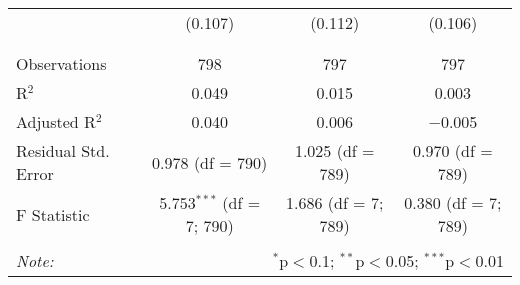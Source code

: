 \begin{table}[!htbp]
\begin{tabular}{@{\extracolsep{5pt}}lccc}
  & (0.107) & (0.112) & (0.106) \\ 
  & & & \\ 
\hline \\[-1.8ex] 
Observations & 798 & 797 & 797 \\ 
R$^{2}$ & 0.049 & 0.015 & 0.003 \\ 
Adjusted R$^{2}$ & 0.040 & 0.006 & $-$0.005 \\ 
Residual Std. Error & 0.978 (df = 790) & 1.025 (df = 789) & 0.970 (df = 789) \\ 
F Statistic & 5.753$^{***}$ (df = 7; 790) & 1.686 (df = 7; 789) & 0.380 (df = 7; 789) \\ 
\hline 
\hline \\[-1.8ex] 
\textit{Note:}  & \multicolumn{3}{r}{$^{*}$p$<$0.1; $^{**}$p$<$0.05; $^{***}$p$<$0.01} \\ 
\end{tabular} 
\end{table} 
